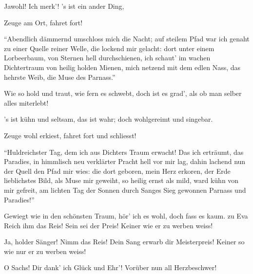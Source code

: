 \begin{drama}

Jawohl! Ich merk'! 's ist ein ander Ding,

\Sachsspeaks
Zeuge am Ort, fahret fort!

\Waltherspeaks
``Abendlich dämmernd umschloss mich die Nacht;
auf steilem Pfad war ich genaht
zu einer Quelle reiner Welle,
die lockend mir gelacht:
dort unter einem Lorbeerbaum,
von Sternen hell durchschienen,
ich schaut' im wachen Dichtertraum
von heilig holden Mienen,
mich netzend mit dem edlen Nass,
das hehrste Weib,
die Muse des Parnass.''


Wie so hold und traut, wie fern es schwebt,
doch ist es grad', als ob man selber alles miterlebt!


's ist kühn und seltsam, das ist wahr;
doch wohlgereimt und singebar.

\Sachsspeaks
Zeuge wohl erkiest, fahret fort und schliesst!

\Waltherspeaks
{}
``Huldreichster Tag,
dem ich aus Dichters Traum erwacht!
Das ich erträumt, das Paradies,
in himmlisch neu verklärter Pracht
hell vor mir lag,
dahin lachend nun der Quell den Pfad mir wies:
die dort geboren, mein Herz erkoren,
der Erde lieblichstes Bild,
als Muse mir geweiht,
so heilig ernst als mild,
ward kühn von mir gefreit,
am lichten Tag der Sonnen
durch Sanges Sieg gewonnen
Parnass und Paradies!''

Gewiegt wie in den schönsten Traum,
hör' ich es wohl, doch fass es kaum.
zu Eva
Reich ihm das Reis! Sein sei der Preis!
Keiner wie er zu werben weiss!


Ja, holder Sänger!
Nimm das Reis!
Dein Sang erwarb dir Meisterpreis!
Keiner so wie nur er zu werben weiss!

\Pognerspeaks
{}

O Sachs! Dir dank' ich Glück und Ehr'!
Vorüber nun all Herzbeschwer!


\Evaspeaks
{}


\end{drama}
